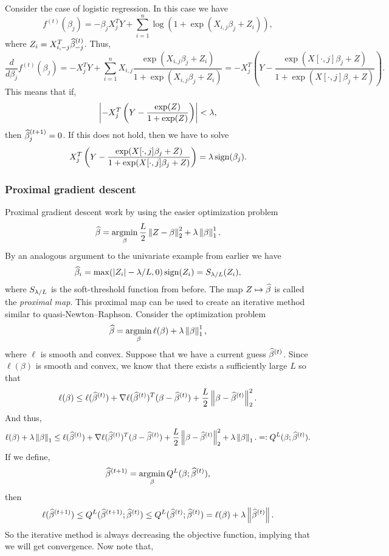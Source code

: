 Consider the case of logistic regression. In this case we have
\[f^{(t)}(\beta_j) = -\beta_jX_j^TY + \sum_{i=1}^n \log\left(1+\exp(X_{i,j}\beta_j + Z_i)\right), \]
where $Z_i = X_{i,- j}^T \widehat{\beta}^{(t)}_{- j}$. Thus,
\[\frac{d}{d\beta_j} f^{(t)}(\beta_j) = -X_j^TY + \sum_{i=1}^n X_{i,j} \frac{\exp(X_{i,j}\beta_j + Z_i)}{1+\exp(X_{i,j}\beta_j + Z_i)} = -X_j^T\left(Y - \frac{\exp(X[\cdot,j]\beta_j +Z)}{1+\exp(X[\cdot,j]\beta_j + Z)}\right). \]
This means that if,
\[{\left\lvert-X_j^T\left(Y - \frac{\exp(Z)}{1+\exp(Z)}\right)\right\rvert} < \lambda, \]
then $\widehat{\beta}_{j}^{(t+1)}=0$. If this does not hold, then we have to solve
\[ X_j^T\left(Y - \frac{\exp(X[\cdot,j]\beta_j +Z)}{1+\exp(X[\cdot,j]\beta_j + Z)}\right) = \lambda \operatorname{sign}(\beta_j).\]
\subsubsection{Proximal gradient descent}
Proximal gradient descent work by using the easier optimization problem 
\[\widehat{\beta} = \operatorname*{argmin}_{\beta} \frac{L}{2}\left\|Z - \beta\right\|_2^2 + \lambda \left\|\beta\right\|_1^1. \]
By an analogous argument to the univariate example from earlier we have 
\[\widehat{\beta}_i= \max({\left\lvert Z_i\right\rvert}-\lambda/L,0)\operatorname{sign}(Z_i) = S_{\lambda/L}(Z_i),  \]
where $S_{\lambda/L}$ is the soft-threshold function from before. The map $Z \mapsto \widehat{\beta}$ is called the \emph{proximal map}. This proximal map can be used to create an iterative method similar to quasi-Newton--Raphson. Consider the optimization problem 
\[\widehat{\beta}=\operatorname*{argmin}_\beta \ell(\beta) + \lambda \left\|\beta\right\|_1^1, \]
where $\ell$ is smooth and convex. Suppose that we have a current guess $\widehat{\beta}^{(t)}$. Since $\ell(\beta)$ is smooth and convex, we know that there exists a sufficiently large $L$ so that 
\[\ell(\beta) \le \ell(\widehat{\beta}^{(t)}) +\nabla \ell(\widehat{\beta}^{(t)})^T(\beta - \widehat{\beta}^{(t)}) + \frac{L}{2}\left\|\beta - \widehat{\beta}^{(t)}\right\|_2^2. \]
And thus,
\[\ell(\beta)+\lambda \left\|\beta\right\|_1 \le \ell(\widehat{\beta}^{(t)}) +\nabla \ell(\widehat{\beta}^{(t)})^T(\beta - \widehat{\beta}^{(t)}) + \frac{L}{2}\left\|\beta - \widehat{\beta}^{(t)}\right\|_2^2 + \lambda \left\|\beta\right\|_1.=: Q^L(\beta; \widehat{\beta}^{(t)}). \]
If we define,
\[\widehat{\beta}^{(t+1)} = \operatorname*{argmin}_\beta Q^L(\beta;\widehat{\beta}^{(t)}), \]
then 
\[\ell(\widehat{\beta}^{(t+1)}) \le Q^L(\widehat{\beta}^{(t+1)};\widehat{\beta}^{(t)}) \le Q^L(\widehat{\beta}^{(t)};\widehat{\beta}^{(t)}) = \ell(\beta)+\lambda\left\|\widehat{\beta}^{(t)}\right\|. \]
So the iterative method is always decreasing the objective function, implying that we will get convergence. Now note that,
